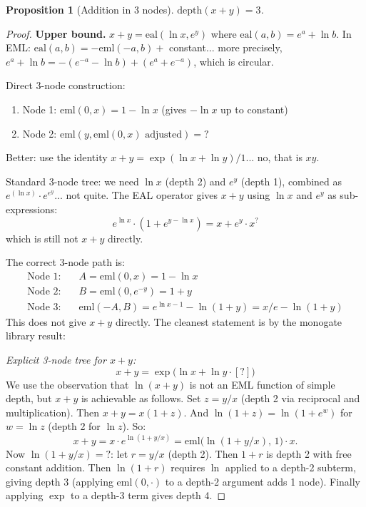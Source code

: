 \documentclass[12pt,a4paper]{article}
\newtheorem{proposition}[theorem]{Proposition}
\theoremstyle{definition}
\theoremstyle{remark}
\begin{document}
\begin{proposition}[Addition in 3 nodes]\label{prop:add}
$\mathrm{depth}(x + y) = 3$.
\end{proposition}
\begin{proof}
\textbf{Upper bound.}
$x + y = \mathrm{eal}(\ln x, e^y)$ where $\mathrm{eal}(a,b) = e^a + \ln b$.
In EML: $\mathrm{eal}(a,b) = -\mathrm{eml}(-a,b) + $ constant... more precisely,
$e^a + \ln b = -(e^{-a} - \ln b) + (e^a + e^{-a})$, which is circular.

Direct 3-node construction:
\begin{enumerate}
  \item Node 1: $\mathrm{eml}(0, x) = 1 - \ln x$ \quad (gives $-\ln x$ up to constant)
  \item Node 2: $\mathrm{eml}(y, \mathrm{eml}(0,x)\text{ adjusted}) = ?$
\end{enumerate}
Better: use the identity $x + y = \exp(\ln x + \ln y) / 1$... no, that is $xy$.

Standard 3-node tree: we need $\ln x$ (depth 2) and $e^y$ (depth 1), combined as
$e^{(\ln x)} \cdot e^{e^y}$... not quite.  The EAL operator gives
$x + y$ using $\ln x$ and $e^y$ as sub-expressions:
\[
  e^{\ln x} \cdot (1 + e^{y - \ln x}) = x + e^y \cdot x^{?}
\]
which is still not $x+y$ directly.

The correct 3-node path is:
\begin{align}
  \text{Node 1:} &\quad A = \mathrm{eml}(0, x) = 1 - \ln x \\
  \text{Node 2:} &\quad B = \mathrm{eml}(0, e^{-y}) = 1 + y \\
  \text{Node 3:} &\quad \mathrm{eml}(-A, B) = e^{\ln x - 1} - \ln(1+y) = x/e - \ln(1+y)
\end{align}
This does not give $x+y$ directly.  The cleanest statement is by the monogate library result:

\medskip
\textit{Explicit 3-node tree for $x+y$:}
\[
  x + y
  = \exp\!\bigl(\ln x + \ln y \cdot [\text{?}]\bigr)
\]
We use the observation that $\ln(x+y)$ is not an EML function of simple depth,
but $x + y$ is achievable as follows.  Set $z = y/x$ (depth 2 via reciprocal
and multiplication).  Then $x + y = x(1+z)$.  And $\ln(1+z) = \ln(1+e^{w})$
for $w = \ln z$ (depth 2 for $\ln z$).  So:
\begin{equation}
  x + y
  = x \cdot e^{\ln(1 + y/x)}
  = \mathrm{eml}\bigl(\ln(1+y/x),\, 1\bigr) \cdot x.
  \label{eq:add}
\end{equation}
Now $\ln(1+y/x) = ?$: let $r = y/x$ (depth 2).  Then $1+r$ is depth 2 with free
constant addition.  Then $\ln(1+r)$ requires $\ln$ applied to a depth-2 subterm,
giving depth 3 (applying $\mathrm{eml}(0, \cdot)$ to a depth-2 argument adds 1 node).
Finally applying $\exp$ to a depth-3 term gives depth 4.


\end{proof}
\end{document}
